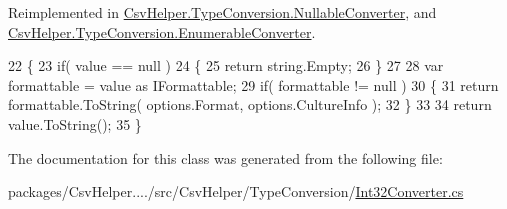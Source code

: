 Reimplemented in \hyperlink{a00114_a7205cdb61d2d119582958232b3e63109}{Csv\-Helper.\-Type\-Conversion.\-Nullable\-Converter}, and \hyperlink{a00076_a7e07e9532857d748654d37db590a0e11}{Csv\-Helper.\-Type\-Conversion.\-Enumerable\-Converter}.


\begin{DoxyCode}
22         \{
23             \textcolor{keywordflow}{if}( value == null )
24             \{
25                 \textcolor{keywordflow}{return} string.Empty;
26             \}
27 
28             var formattable = value as IFormattable;
29             \textcolor{keywordflow}{if}( formattable != null )
30             \{
31                 \textcolor{keywordflow}{return} formattable.ToString( options.Format, options.CultureInfo );
32             \}
33 
34             \textcolor{keywordflow}{return} value.ToString();
35         \}
\end{DoxyCode}


The documentation for this class was generated from the following file\-:\begin{DoxyCompactItemize}
\item 
packages/\-Csv\-Helper..../src/\-Csv\-Helper/\-Type\-Conversion/\hyperlink{a00233}{Int32\-Converter.\-cs}\end{DoxyCompactItemize}
